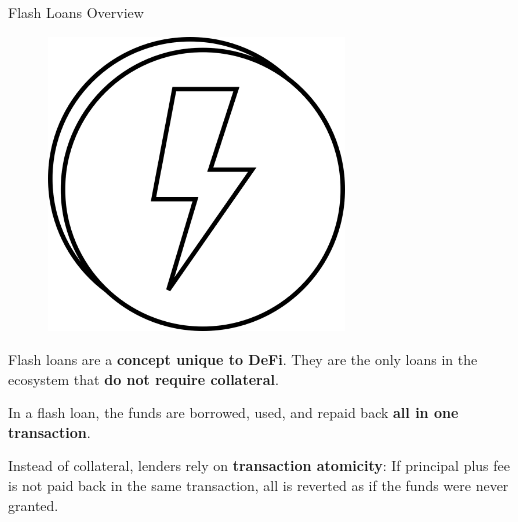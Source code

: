 \documentclass[handout]{beamer}
\begin{document}
\begin{frame}{Flash Loans Overview}

\begin{minipage}{0.3\textwidth}
	\begin{figure}
		\includegraphics[width=0.7\textwidth]{../assets/images/flashloan}	
	\end{figure}
\end{minipage}
\begin{minipage}{0.65\textwidth}
	Flash loans are a \textbf{concept unique to DeFi}. They are the only loans in the ecosystem that \textbf{do not require collateral}.
\end{minipage}

 {
\vspace{2em}
In a flash loan, the funds are borrowed, used, and repaid back \textbf{all in one transaction}.
}

\vspace{1em}

 {
Instead of collateral, lenders rely on \textbf{transaction atomicity}: If principal plus fee is not paid back in the same transaction, all is reverted as if the funds were never granted.
}

\end{frame}
\end{document}
